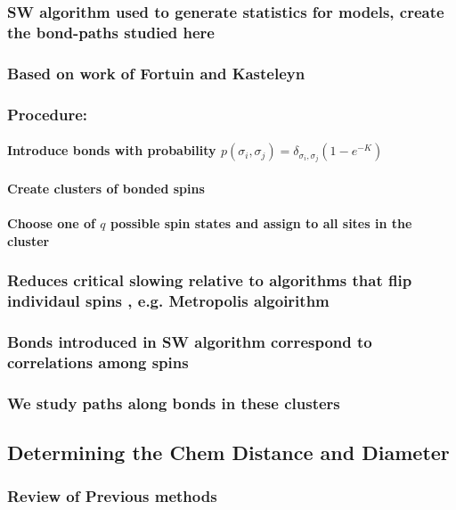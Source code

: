 \documentclass[pre,preprint]{revtex4-1}
\begin{document}
\subsubsection{SW algorithm \cite{SwWA} used to generate statistics for models, create the bond-paths studied here}
\label{sec-2.1.1}
\subsubsection{Based on work of Fortuin and Kasteleyn \cite{FoKa}}
\label{sec-2.1.2}
\subsubsection{Procedure:}
\label{sec-2.1.3}
\paragraph{Introduce bonds with probability $p(\sigma_i,\sigma_j) = \delta_{\sigma_i, \sigma_j} (1-e^{-K})$}
\label{sec-2.1.3.1}
\paragraph{Create clusters of bonded spins}
\label{sec-2.1.3.2}
\paragraph{Choose one of $q$ possible spin states and assign to all sites in the cluster}
\label{sec-2.1.3.3}
\subsubsection{Reduces critical slowing relative to algorithms that flip individaul spins \cite{NeBa99}, e.g. Metropolis algoirithm \cite{Met}}
\label{sec-2.1.4}
\subsubsection{Bonds introduced in SW algorithm correspond to correlations among spins}
\label{sec-2.1.5}
\subsubsection{We study paths along bonds in these clusters}
\label{sec-2.1.6}
\subsection{Determining the Chem Distance and Diameter}
\label{sec-2.2}
\subsubsection{Review of Previous methods}
\label{sec-2.2.1}
\end{document}
